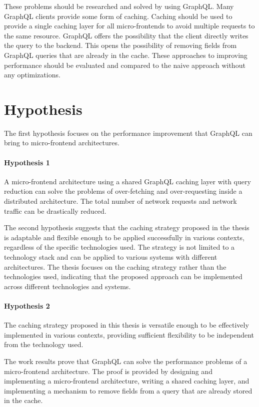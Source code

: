 \bigskip

\noindent These problems should be researched and solved by using GraphQL. Many GraphQL clients provide some form of caching. Caching should be used to provide a single caching layer for all micro-frontends to avoid multiple requests to the same resource. GraphQL offers the possibility that the client directly writes the query to the backend. This opens the possibility of removing fields from GraphQL queries that are already in the cache. These approaches to improving performance should be evaluated and compared to the naive approach without any optimizations.

\section{Hypothesis}\label{section:introduction:hypothesis}

The first hypothesis focuses on the performance improvement that GraphQL can bring to micro-frontend architectures.

\paragraph{Hypothesis 1} 
A micro-frontend architecture using a shared GraphQL caching layer with query reduction can solve the problems of over-fetching and over-requesting inside a distributed architecture. The total number of network requests and network traffic can be drastically reduced.

\bigskip

\noindent The second hypothesis suggests that the caching strategy proposed in the thesis is adaptable and flexible enough to be applied successfully in various contexts, regardless of the specific technologies used. The strategy is not limited to a technology stack and can be applied to various systems with different architectures. The thesis focuses on the caching strategy rather than the technologies used, indicating that the proposed approach can be implemented across different technologies and systems.

\paragraph{Hypothesis 2}
The caching strategy proposed in this thesis is versatile enough to be effectively implemented in various contexts, providing sufficient flexibility to be independent from the technology used.

\bigskip

\noindent The work results prove that GraphQL can solve the performance problems of a micro-frontend architecture. The proof is provided by designing and implementing a micro-frontend architecture, writing a shared caching layer, and implementing a mechanism to remove fields from a query that are already stored in the cache.

